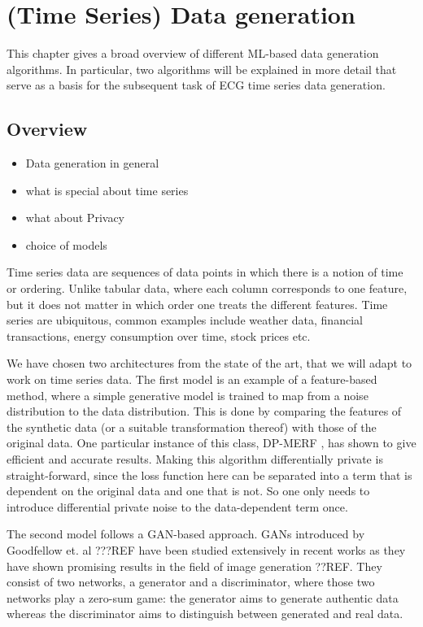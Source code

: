 \section[(Time Series) Data generation]{(Time Series) Data generation}\label{chapter3}

This chapter gives a broad overview of different ML-based data generation algorithms. In particular, two algorithms will be explained in more detail that serve as a basis for the subsequent task of ECG time series data generation.

\subsection{Overview}
    \begin{itemize}
        \item Data generation in general
        \item what is special about time series
        \item what about Privacy
        \item choice of models
    \end{itemize}

Time series data are sequences of data points in which there is a notion of time or ordering. Unlike tabular data, where each column corresponds to one feature, but it does not matter in which order one treats the different features. Time series are ubiquitous, common examples include weather data, financial transactions, energy consumption over time, stock prices etc.

We have chosen two architectures from the state of the art, that we will adapt to work on time series data. The first model is an example of a feature-based method, where a simple generative model is trained to map from a noise distribution to the data distribution. This is done by comparing the features of the synthetic data (or a suitable transformation thereof) with those of the original data. One particular instance of this class, DP-MERF \parencite{dpmerf}, has shown to give efficient and accurate results. Making this algorithm differentially private is straight-forward, since the loss function here can be separated into a term that is dependent on the original data and one that is not. So one only needs to introduce differential private noise to the data-dependent term once.


The second model follows a GAN-based approach. GANs introduced by Goodfellow et. al ???REF have been studied extensively in recent works as they have shown promising results in the field of image generation ??REF. They consist of two networks, a generator and a discriminator, where those two networks play a zero-sum game: the generator aims to generate authentic data whereas the discriminator aims to distinguish between generated and real data.


